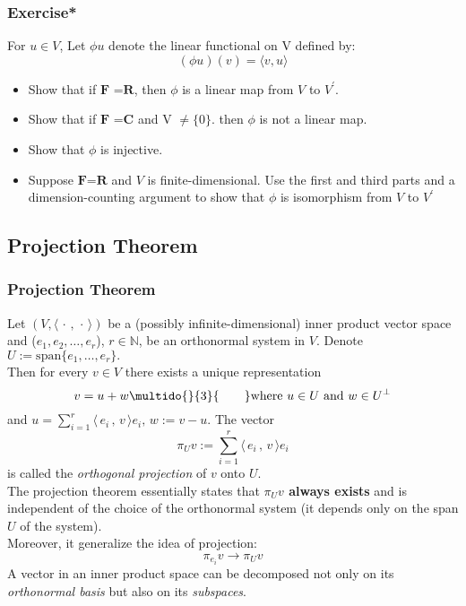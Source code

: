 \documentclass[12pt, t]{beamer}
\renewcommand{\emph}[1]{{\color{Turquoise3}\textsl{#1}}}
\newcommand{\N}{\mathbb{N}}
\newcommand{\myseries}[2]{$#1_1,#1_2,\dots,#1_#2$}
\newcommand{\nullspace}{~\\[15pt]}
\newcommand{\scp}[2]{\langle\,#1\,,\,#2\,\rangle} \newcommand{\scpp}{\langle\,\cdot\,,\,\cdot\,\rangle}
\begin{document}
\begin{frame}
    \frametitle{Exercise*}
    For $u \in V$, Let $\phi u$ denote the linear functional on V defined by:
    \[
    (\phi u)(v)=\langle v,u \rangle    
    \]
    \begin{itemize}
        \item Show that if $\textbf{F =R}$, then $\phi$ is a linear map from $V$ to $V^{'}$.
        \item Show that if $\textbf{F =C}$ and V $\neq\{0\}$. then $\phi$ is not a linear map.
        \item Show that $\phi$ is injective.
        \item Suppose $\textbf{F=R}$ and $V$ is finite-dimensional. Use the first and third parts and a dimension-counting argument to show that $\phi$ is isomorphism from $V$ to $V^{'}$
    \end{itemize}
\end{frame}

\subsection{Projection Theorem}
\begin{frame}[allowframebreaks]
    \frametitle{Projection Theorem}
    Let $(V,\scpp)$ be a (possibly infinite-dimensional) inner product vector space and (\myseries{e}{r}), $r\in\N$, be an orthonormal system in $V$. Denote $U:=\text{span}\{e_1,\ldots,e_r\}.$\\
    Then for every $v\in V$ there exists a unique representation
    \begin{equation*}
        v=u+w\multido{}{3}{\qquad}\text{where}~u\in U~\text{and}~w\in U^{\perp}
    \end{equation*}
    and $u=\sum\limits_{i=1}^{r}\scp{e_i}{v}e_i,\,w:=v-u.$
    The vector
    \begin{equation*}
        \pi_Uv:=\sum_{i=1}^{r}\scp{e_i}{v}e_i
    \end{equation*}
    is called the \emph{orthogonal projection} of $v$ onto $U$.\\
    \newpage
    The projection theorem essentially states that \textbf{$\pi_Uv$ always exists} and is independent of the choice of the orthonormal system (it depends only on the span $U$ of the system).
    \nullspace
    Moreover, it generalize the idea of projection:
    $$
        \pi_{e_i}v\rightarrow\pi_Uv
    $$
    A vector in an inner product space can be decomposed not only on its \emph{orthonormal basis} but also on its \emph{subspaces}.
\end{frame}
\end{document}
